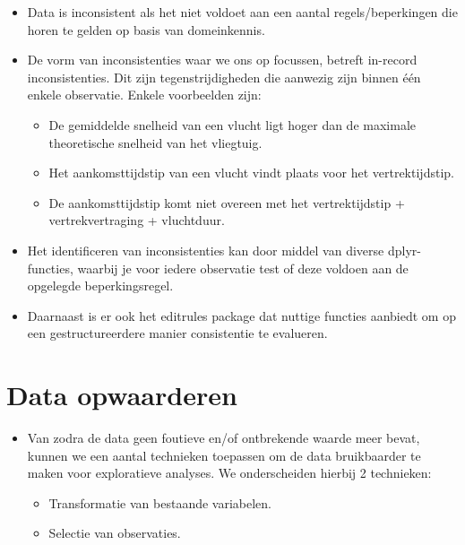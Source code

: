 \documentclass[]{tufte-book}
\providecommand{\tightlist}{%
  \setlength{\itemsep}{0pt}\setlength{\parskip}{0pt}}
\begin{document}
\begin{itemize}
\tightlist
\item
  Data is inconsistent als het niet voldoet aan een aantal regels/beperkingen die horen te gelden op basis van domeinkennis.
\item
  De vorm van inconsistenties waar we ons op focussen, betreft in-record inconsistenties. Dit zijn tegenstrijdigheden die aanwezig zijn binnen één enkele observatie. Enkele voorbeelden zijn:

  \begin{itemize}
  \tightlist
  \item
    De gemiddelde snelheid van een vlucht ligt hoger dan de maximale theoretische snelheid van het vliegtuig.
  \item
    Het aankomsttijdstip van een vlucht vindt plaats voor het vertrektijdstip.
  \item
    De aankomsttijdstip komt niet overeen met het vertrektijdstip + vertrekvertraging + vluchtduur.
  \end{itemize}
\item
  Het identificeren van inconsistenties kan door middel van diverse dplyr-functies, waarbij je voor iedere observatie test of deze voldoen aan de opgelegde beperkingsregel.
\item
  Daarnaast is er ook het editrules package dat nuttige functies aanbiedt om op een gestructureerdere manier consistentie te evalueren.
\end{itemize}

\hypertarget{data-opwaarderen}{%
\section{Data opwaarderen}\label{data-opwaarderen}}

\begin{itemize}
\tightlist
\item
  Van zodra de data geen foutieve en/of ontbrekende waarde meer bevat, kunnen we een aantal technieken toepassen om de data bruikbaarder te maken voor exploratieve analyses. We onderscheiden hierbij 2 technieken:

  \begin{itemize}
  \tightlist
  \item
    Transformatie van bestaande variabelen.
  \item
    Selectie van observaties.
  \end{itemize}
\end{itemize}
\end{document}
